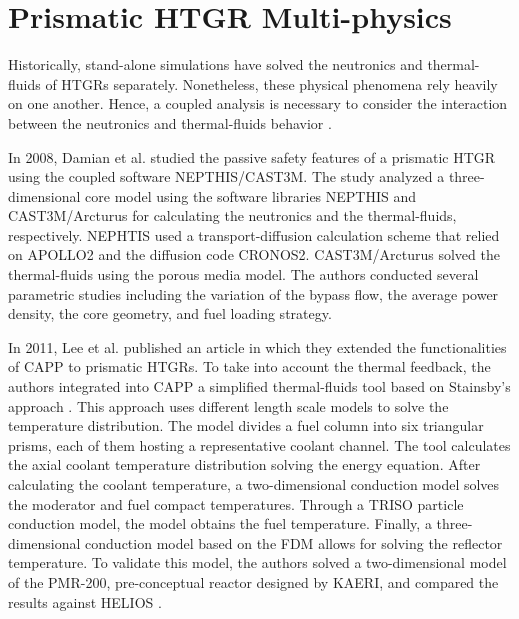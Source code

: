 \section{Prismatic HTGR Multi-physics}
\label{sec:litreview-multi}

Historically, stand-alone simulations have solved the neutronics and thermal-fluids of HTGRs separately.
Nonetheless, these physical phenomena rely heavily on one another.
Hence, a coupled analysis is necessary to consider the interaction between the neutronics and thermal-fluids behavior \cite{tak_cappgamma_2016}.

In 2008, Damian et al. \cite{damian_vhtr_2008} studied the passive safety features of a prismatic HTGR using the coupled software NEPTHIS/CAST3M.
The study analyzed a three-dimensional core model using the software libraries NEPTHIS and CAST3M/Arcturus for calculating the neutronics and the thermal-fluids, respectively.
NEPHTIS used a transport-diffusion calculation scheme that relied on APOLLO2 \cite{sanchez_apollo2_1999} and the diffusion code CRONOS2.
CAST3M/Arcturus solved the thermal-fluids using the porous media model.
The authors conducted several parametric studies including the variation of the bypass flow, the average power density, the core geometry, and fuel loading strategy.

In 2011, Lee et al. published an article \cite{lee_development_2011} in which they extended the functionalities of CAPP to prismatic HTGRs.
To take into account the thermal feedback, the authors integrated into CAPP a simplified thermal-fluids tool based on Stainsby's approach \cite{stainsby_investigation_2008}.
This approach uses different length scale models to solve the temperature distribution.
The model divides a fuel column into six triangular prisms, each of them hosting a representative coolant channel.
The tool calculates the axial coolant temperature distribution solving the energy equation.
After calculating the coolant temperature, a two-dimensional conduction model solves the moderator and fuel compact temperatures.
Through a TRISO particle conduction model, the model obtains the fuel temperature.
Finally, a three-dimensional conduction model based on the \gls{FDM} allows for solving the reflector temperature.
To validate this model, the authors solved a two-dimensional model of the PMR-200, pre-conceptual reactor designed by \gls{KAERI}, and compared the results against HELIOS \cite{stammler_helios_1998}.

